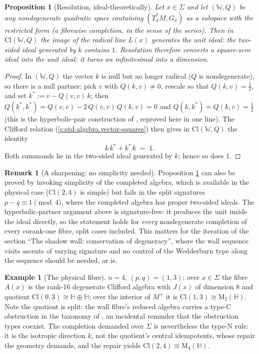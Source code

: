\documentclass[11pt]{article}
\newtheorem{proposition}[theorem]{Proposition}
\theoremstyle{definition}
\newtheorem{remark}[theorem]{Remark}
\newtheorem{example}[theorem]{Example}
\theoremstyle{plain}
\providecommand{\Cl}{}\renewcommand{\Cl}{\mathrm{Cl}}
\providecommand{\HH}{}\renewcommand{\HH}{\mathbb{H}}
\providecommand{\Mat}{}\renewcommand{\Mat}{\mathrm{M}}
\providecommand{\Mp}{}\renewcommand{\Mp}{M^{+}}
\providecommand{\Sig}{}\renewcommand{\Sig}{\Sigma}
\providecommand{\shL}{}\renewcommand{\shL}{L}
\begin{document}
\begin{proposition}[Resolution, ideal-theoretically]\label{c:sheaf.resolution-ideal-theoretically}
Let $x \in \Sig$ and let $(\mathbb{W}, Q)$ be any nondegenerate quadratic space containing $(T^*_xM, G_x)$ as a subspace with the restricted form (a fibrewise completion, in the sense of the series). Then in $\Cl(\mathbb{W}, Q)$ the image of the radical line $\shL(x)$ generates the \emph{unit} ideal: the two-sided ideal generated by $k$ contains $1$. Resolution therefore converts a square-zero ideal into the unit ideal: it turns an infinitesimal into a dimension.
\end{proposition}
\begin{proof}
In $(\mathbb{W}, Q)$ the vector $k$ is null but no longer radical ($Q$ is nondegenerate), so there is a null partner: pick $v$ with $Q(k, v) \neq 0$, rescale so that $Q(k,v) = \tfrac12$, and set $k^* := v - Q(v,v)\,k$; then $Q(k^*, k^*) = Q(v,v) - 2\,Q(v,v)\,Q(k,v) = 0$ and $Q(k, k^*) = Q(k,v) = \tfrac12$ (this is the hyperbolic-pair construction of \cite[\S 2.2]{ButlerT1}, reproved here in one line). The Clifford relation (\ref{c:std-algebra.vector-squares}) then gives in $\Cl(\mathbb{W}, Q)$ the identity
\[
k\,k^* + k^*\,k \;=\; 1 .
\]
Both summands lie in the two-sided ideal generated by $k$; hence so does $1$.

\end{proof}

\begin{remark}[A sharpening: no simplicity needed]\label{c:note.sheaf.sharpening-no-simplicity-needed}
Proposition \ref{c:sheaf.resolution-ideal-theoretically} can also be proved by invoking simplicity of the completed algebra, which is available in the physical case ($\Cl(2,4)$ is simple) but fails in the split signatures $p - q \equiv 1 \pmod 4$, where the completed algebra has proper two-sided ideals. The hyperbolic-partner argument above is signature-free: it produces the unit inside the ideal directly, so the statement holds for \emph{every} nondegenerate completion of every corank-one fibre, split cases included. This matters for the iteration of the section ``The shadow wall: conservation of degeneracy'', where the wall sequence visits ascents of varying signature and no control of the Wedderburn type along the sequence should be needed, or is.
\end{remark}

\begin{example}[The physical fibre]\label{c:note.sheaf.physical-fibre}
$n = 4$, $(p,q) = (1,3)$: over $x \in \Sig$ the fibre $A(x)$ is the rank-16 degenerate Clifford algebra with $J(x)$ of dimension 8 and quotient $\Cl(0,3) \cong \HH \oplus \HH$; over the interior of $\Mp$ it is $\Cl(1,3) \cong \Mat_2(\HH)$. Note the quotient is split: the wall fibre's reduced algebra carries a type-C obstruction in the taxonomy of \cite{ButlerT1}, an incidental reminder that the obstruction types coexist. The completion demanded over $\Sig$ is nevertheless the type-N rule: it is the isotropic direction $k$, not the quotient's central idempotents, whose repair the geometry demands, and the repair yields $\Cl(2,4) \cong \Mat_4(\HH)$.
\end{example}
\end{document}

